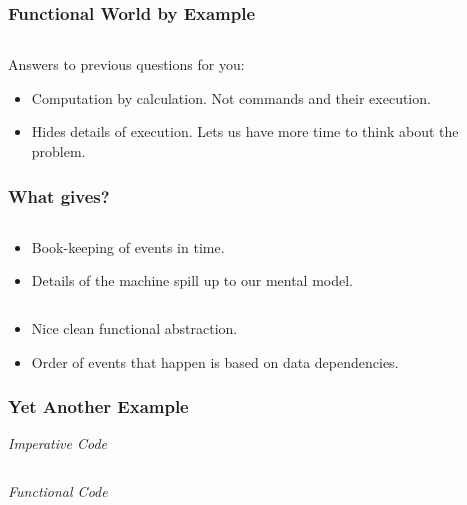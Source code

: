 \documentclass{beamer}
\begin{document}
\begin{frame}[fragile,t]
  \frametitle{Functional World by Example}

  \inputminted[frame=lines,fontsize=\footnotesize,linenos=true]{haskell}{code/slides/SumFive.hs}

  Answers to previous questions for you:
  \begin{itemize}
  \item Computation by calculation. Not commands and their execution.
  \item Hides details of execution. Lets us have more time to think about the problem.
  \end{itemize}

\end{frame}

\begin{frame}[fragile,t]
  \frametitle{What gives?}

  \begin{multicols}{2}

    \inputminted[frame=lines,fontsize=\tiny]{c}{code/slides/sumfive.c}

    \begin{itemize}
    \item Book-keeping of events in time.
    \item Details of the machine spill up to our mental model.
    \end{itemize}

    \columnbreak

    \inputminted[frame=lines,fontsize=\tiny]{haskell}{code/slides/SumFiveShort.hs}

    \begin{itemize}
    \item Nice clean functional abstraction.
    \item Order of events that happen is based on data dependencies.
    \end{itemize}

  \end{multicols}

\end{frame}

\begin{frame}[fragile,t]
  \frametitle{Yet Another Example}

  \emph{Imperative Code}
  \inputminted[frame=lines,fontsize=\footnotesize]{c}{code/slides/primes.c}

  \vfill

  \emph{Functional Code}
  \inputminted[frame=lines,fontsize=\footnotesize]{haskell}{code/slides/Primes.hs}

\end{frame}
\end{document}
